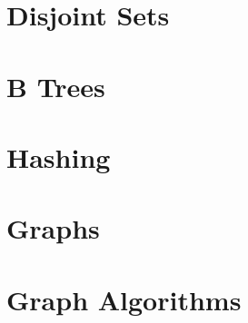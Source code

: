 \documentclass[
]{book}
\begin{document}
\hypertarget{disjoint-sets}{%
\chapter{Disjoint Sets}\label{disjoint-sets}}

\hypertarget{b-trees}{%
\chapter{B Trees}\label{b-trees}}

\hypertarget{hashing}{%
\chapter{Hashing}\label{hashing}}

\hypertarget{graphs}{%
\chapter{Graphs}\label{graphs}}

\hypertarget{graph-algorithms}{%
\chapter{Graph Algorithms}\label{graph-algorithms}}
\end{document}
